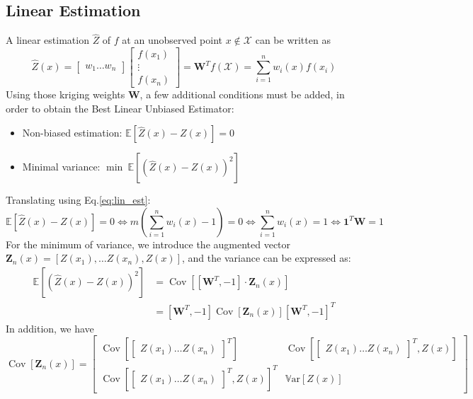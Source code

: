\documentclass[a4paper,11pt]{article}
\newcommand{\Var}{\mathbb{V}\text{ar}}
\newcommand{\Ex}{\mathbb{E}}
\DeclareMathOperator{\Cov}{\mathrm{Cov}}
\theoremstyle{defi}
\numberwithin{thmCounter}{section}
\begin{document}
\subsection{Linear Estimation}
\label{sec:linear_estimation}
A linear estimation $\hat{Z}$ of $f$ at an unobserved point $x\notin \mathcal{X}$ can be written as
\begin{equation}
  \label{eq:lin_est}
  \hat{Z}(x) =
  \begin{bmatrix}
    w_1 \dots w_n
    \end{bmatrix}
    \begin{bmatrix}
      f(x_1) \\ \vdots \\ f(x_n)
    \end{bmatrix} = \mathbf{W}^Tf(\mathcal{X}) = \sum_{i=1}^n w_i(x) f(x_i)
\end{equation}
Using those kriging weights $\mathbf{W}$, a few additional conditions must be added, in order to obtain the Best Linear Unbiased Estimator:
\begin{itemize}
\item Non-biased estimation: $\Ex[\hat{Z}(x) - Z(x)]=0$
\item Minimal variance: $\min~\Ex[(\hat{Z}(x) - Z(x))^2]$
\end{itemize}
Translating using Eq.\eqref{eq:lin_est}:
\begin{equation}
  \Ex[\hat{Z}(x) - Z(x)]=0 \iff m(\sum_{i=1}^n w_i(x)-1) = 0 \iff \sum_{i=1}^n w_i(x) = 1 \iff \mathbf{1}^T \mathbf{W} = 1
\end{equation}
For the minimum of variance, we introduce the augmented vector $\mathbf{Z}_n(x) = [Z(x_1),\dots Z(x_n), Z(x)]$, and
the variance can be expressed as:
\begin{align}
  \Ex[(\hat{Z}(x) - Z(x))^2] &= \Cov\left[[\mathbf{W}^T, -1] \cdot \mathbf{Z}_n(x) \right] \\
                             &= [\mathbf{W}^T, -1] \Cov\left[\mathbf{Z}_n(x) \right] [\mathbf{W}^T, -1]^T
\end{align}
In addition, we have
\begin{equation}
  \Cov\left[\mathbf{Z}_n(x) \right] =
  \begin{bmatrix}
    \Cov\left[
      \begin{bmatrix}
        Z(x_1) \dots Z(x_n)
      \end{bmatrix}^T\right]
    & \Cov\left[
      \begin{bmatrix}
        Z(x_1) \dots Z(x_n)
      \end{bmatrix}^T, Z(x) \right]
  \\
  \Cov\left[
    \begin{bmatrix}
      Z(x_1) \dots Z(x_n)
    \end{bmatrix}^T, Z(x) \right]^T & \Var\left[Z(x)\right]
  \end{bmatrix}
\end{equation}
\end{document}
